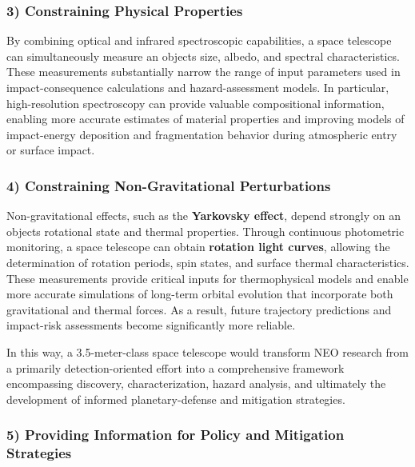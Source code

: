 \subsubsection{3) Constraining Physical Properties}\label{constraining-physical-properties}

By combining optical and infrared spectroscopic capabilities, a space telescope can simultaneously measure an object\textquotesingle s size, albedo, and spectral characteristics. These measurements substantially narrow the range of input parameters used in impact-consequence calculations and hazard-assessment models. In particular, high-resolution spectroscopy can provide valuable compositional information, enabling more accurate estimates of material properties and improving models of impact-energy deposition and fragmentation behavior during atmospheric entry or surface impact.

\subsubsection{4) Constraining Non-Gravitational Perturbations}\label{constraining-non-gravitational-perturbations}

Non-gravitational effects, such as the \textbf{Yarkovsky effect}, depend strongly on an object\textquotesingle s rotational state and thermal properties. Through continuous photometric monitoring, a space telescope can obtain \textbf{rotation light curves}, allowing the determination of rotation periods, spin states, and surface thermal characteristics. These measurements provide critical inputs for thermophysical models and enable more accurate simulations of long-term orbital evolution that incorporate both gravitational and thermal forces. As a result, future trajectory predictions and impact-risk assessments become significantly more reliable.

In this way, a 3.5-meter-class space telescope would transform NEO research from a primarily detection-oriented effort into a comprehensive framework encompassing discovery, characterization, hazard analysis, and ultimately the development of informed planetary-defense and mitigation strategies.

\subsubsection{5) Providing Information for Policy and Mitigation Strategies}\label{providing-information-for-policy-and-mitigation-strategies}

